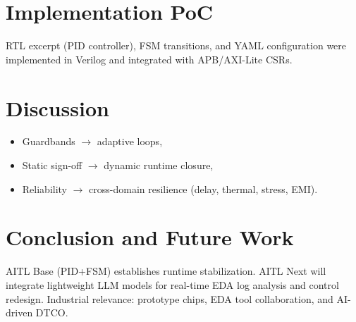 \documentclass[conference]{IEEEtran}
\begin{document}
\section{Implementation PoC}
RTL excerpt (PID controller), FSM transitions, and YAML configuration were implemented in Verilog and integrated with APB/AXI-Lite CSRs.

\section{Discussion}
\begin{itemize}
  \item Guardbands $\to$ adaptive loops,
  \item Static sign-off $\to$ dynamic runtime closure,
  \item Reliability $\to$ cross-domain resilience (delay, thermal, stress, EMI).
\end{itemize}

\section{Conclusion and Future Work}
AITL Base (PID+FSM) establishes runtime stabilization.  
AITL Next will integrate lightweight LLM models for real-time EDA log analysis and control redesign.  
Industrial relevance: prototype chips, EDA tool collaboration, and AI-driven DTCO.



\end{document}

